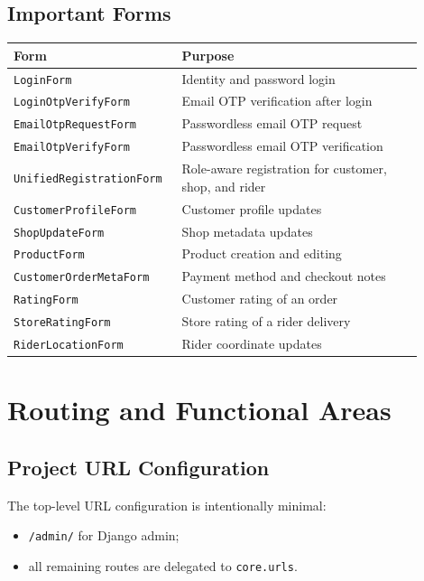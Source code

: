 \documentclass[12pt,a4paper]{article}
\begin{document}
\subsection{Important Forms}
\begin{longtable}{|p{0.34\linewidth}|p{0.56\linewidth}|}
\hline
\textbf{Form} & \textbf{Purpose} \\
\hline
\texttt{LoginForm} & Identity and password login \\
\hline
\texttt{LoginOtpVerifyForm} & Email OTP verification after login \\
\hline
\texttt{EmailOtpRequestForm} & Passwordless email OTP request \\
\hline
\texttt{EmailOtpVerifyForm} & Passwordless email OTP verification \\
\hline
\texttt{UnifiedRegistrationForm} & Role-aware registration for customer, shop, and rider \\
\hline
\texttt{CustomerProfileForm} & Customer profile updates \\
\hline
\texttt{ShopUpdateForm} & Shop metadata updates \\
\hline
\texttt{ProductForm} & Product creation and editing \\
\hline
\texttt{CustomerOrderMetaForm} & Payment method and checkout notes \\
\hline
\texttt{RatingForm} & Customer rating of an order \\
\hline
\texttt{StoreRatingForm} & Store rating of a rider delivery \\
\hline
\texttt{RiderLocationForm} & Rider coordinate updates \\
\hline
\end{longtable}

\section{Routing and Functional Areas}
\subsection{Project URL Configuration}
The top-level URL configuration is intentionally minimal:
\begin{itemize}[leftmargin=1.5em]
    \item \texttt{/admin/} for Django admin;
    \item all remaining routes are delegated to \texttt{core.urls}.
\end{itemize}
\end{document}
